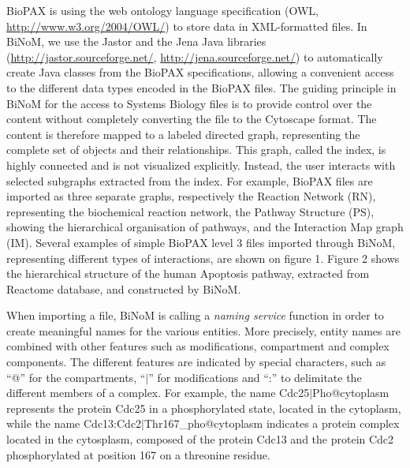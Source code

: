 \documentclass[10pt]{bmc_article}
\newenvironment{bmcformat}{\baselineskip20pt\sloppy\setboolean{publ}{false}}{\baselineskip20pt\sloppy}
\begin{document}
\begin{bmcformat}
BioPAX is using the web ontology language specification (OWL,
\url{http://www.w3.org/2004/OWL/}) to store data in XML-formatted files. In
BiNoM, we use the Jastor and the Jena Java libraries
(\url{http://jastor.sourceforge.net/}, \url{http://jena.sourceforge.net/}) to
automatically create Java classes from the BioPAX specifications, allowing a
convenient access to the different data types encoded in the BioPAX files. The
guiding principle in BiNoM for the
access to Systems Biology files is to provide control over the content without
completely converting the file to the Cytoscape format. The content is therefore
mapped to a labeled directed graph, representing the complete set of objects and
their relationships. This graph, called the index, is highly connected and is
not visualized explicitly. Instead, the user interacts with selected subgraphs
extracted from the index. For example, BioPAX files are imported as three
separate graphs, respectively the Reaction Network (RN), representing the
biochemical reaction network, the Pathway Structure (PS), showing the
hierarchical organisation of pathways, and the Interaction Map graph
(IM). Several examples of simple BioPAX level 3 files imported through BiNoM,
representing different types of interactions, are shown on figure 1. Figure 2
shows the hierarchical structure of the human Apoptosis pathway, extracted
from Reactome database, and constructed by BiNoM.

When importing a file, BiNoM is calling a \emph{naming service} function in
order to create meaningful names for the various entities. More precisely,
entity names are combined with other features such as modifications, compartment
and complex components. The different features are indicated by special
characters, such as ``@'' for the compartments, ``$|$'' for modifications and
``:'' to delimitate the different members of a complex. For example, the
name Cdc25$|$Pho@cytoplasm represents the protein Cdc25 in a phosphorylated
state, located in the cytoplasm, while the name
Cdc13:Cdc2$|$Thr167\_pho@cytoplasm indicates a protein complex located in the
cytosplasm, composed of the protein Cdc13 and the protein Cdc2 phosphorylated at
position 167 on a threonine residue.



\end{bmcformat}
\end{document}
